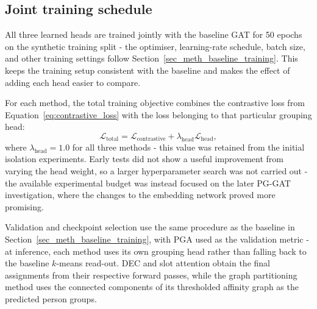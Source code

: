 \subsection{Joint training schedule}
\label{sec_meth_learned_heads_training}

All three learned heads are trained jointly with the baseline GAT
for 50 epochs on the synthetic training split -
the optimiser, learning-rate schedule, batch size, and other training settings
follow Section~\ref{sec_meth_baseline_training}.
This keeps the training setup consistent with the baseline
and makes the effect of adding each head easier to compare.

For each method,
the total training objective combines the contrastive loss from Equation~\eqref{eq:contrastive_loss}
with the loss belonging to that particular grouping head:
\begin{equation}
    \mathcal{L}_{\text{total}}
    =
    \mathcal{L}_{\text{contrastive}}
    +
    \lambda_{\text{head}}\mathcal{L}_{\text{head}},
\end{equation}
where $\lambda_{\text{head}} = 1.0$ for all three methods -
this value was retained from the initial isolation experiments.
Early tests did not show a useful improvement from varying the head weight,
so a larger hyperparameter search was not carried out -
the available experimental budget was instead focused on the later PG-GAT investigation,
where the changes to the embedding network proved more promising.

Validation and checkpoint selection use the same procedure as the baseline
in Section~\ref{sec_meth_baseline_training},
with PGA used as the validation metric -
at inference,
each method uses its own grouping head rather than falling back to the baseline $k$-means read-out.
DEC and slot attention obtain the final assignments from their respective forward passes,
while the graph partitioning method uses the connected components
of its thresholded affinity graph as the predicted person groups.